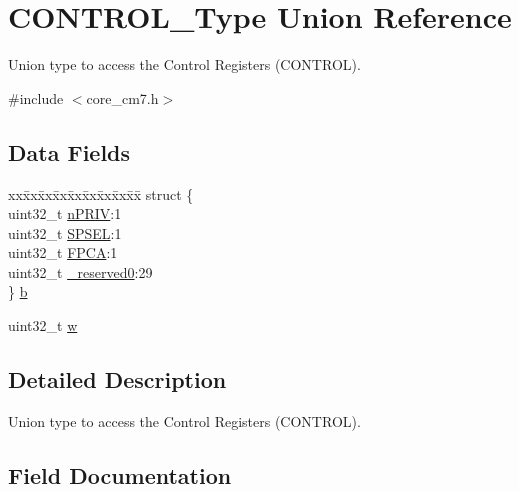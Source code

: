\hypertarget{unionCONTROL__Type}{}\section{C\+O\+N\+T\+R\+O\+L\+\_\+\+Type Union Reference}
\label{unionCONTROL__Type}


Union type to access the Control Registers (C\+O\+N\+T\+R\+OL).  




{\ttfamily \#include $<$core\+\_\+cm7.\+h$>$}

\subsection*{Data Fields}
\begin{DoxyCompactItemize}
\item 
\begin{tabbing}
xx\=xx\=xx\=xx\=xx\=xx\=xx\=xx\=xx\=\kill
struct \{\\
\>uint32\_t \mbox{\hyperlink{unionCONTROL__Type_a35c1732cf153b7b5c4bd321cf1de9605}{nPRIV}}:1\\
\>uint32\_t \mbox{\hyperlink{unionCONTROL__Type_a8cc085fea1c50a8bd9adea63931ee8e2}{SPSEL}}:1\\
\>uint32\_t \mbox{\hyperlink{unionCONTROL__Type_ac62cfff08e6f055e0101785bad7094cd}{FPCA}}:1\\
\>uint32\_t \mbox{\hyperlink{unionCONTROL__Type_af8c314273a1e4970a5671bd7f8184f50}{\_reserved0}}:29\\
\} \mbox{\hyperlink{unionCONTROL__Type_a7579e944a74b155b0e5f1c17ac0309d7}{b}}\\

\end{tabbing}\item 
uint32\+\_\+t \mbox{\hyperlink{unionCONTROL__Type_a6b642cca3d96da660b1198c133ca2a1f}{w}}
\end{DoxyCompactItemize}


\subsection{Detailed Description}
Union type to access the Control Registers (C\+O\+N\+T\+R\+OL). 

\subsection{Field Documentation}
\mbox{\label{unionCONTROL__Type_af8c314273a1e4970a5671bd7f8184f50}} 
